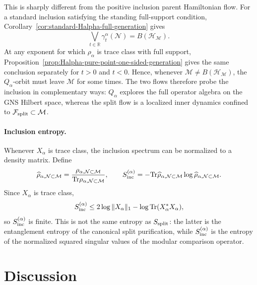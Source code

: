 \documentclass[a4paper,11pt]{article}
\theoremstyle{definition}
\newcommand{\Tr}{\text{Tr}}
\newcommand{\mN}{\mathcal{N}}
\newcommand{\mH}{\mathcal{H}}
\newcommand{\mM}{\mathcal{M}}
\begin{document}
This is sharply different from the positive inclusion parent Hamiltonian flow. For
a standard inclusion satisfying the standing full-support condition, Corollary~\ref{cor:standard-Halpha-full-generation}
gives
\begin{equation}
    \bigvee_{t\in\mathbb R}
    \gamma_t^\alpha(\mN)
    =B(\mH_{\mM}).
    \label{eq:Hinc-does-not-preserve-N}
\end{equation}
At any exponent for which $\rho_\alpha$ is trace class with full support,
Proposition~\ref{prop:Halpha-pure-point-one-sided-generation} gives the same
conclusion separately for $t>0$ and $t<0$.
Hence, whenever $\mM\neq B(\mH_{\mM})$, the $Q_\alpha$-orbit must
leave $\mM$ for some times. The two flows therefore probe the inclusion
in complementary ways: $Q_\alpha$ explores the full operator algebra on the
GNS Hilbert space, whereas the split flow is a localized inner dynamics
confined to $\mathcal F_{\rm split}\subset\mM$.

\paragraph{Inclusion entropy.}
Whenever $X_\alpha$ is trace class, the inclusion spectrum can be normalized to a density matrix. Define
\begin{equation}
    \widehat\rho_{\alpha,\mN\subset\mM}
    =\frac{\rho_{\alpha,\mN\subset\mM}}
           {\Tr\rho_{\alpha,\mN\subset\mM}},
    \qquad
    S_{\rm inc}^{(\alpha)}
    =-\Tr\widehat\rho_{\alpha,\mN\subset\mM}
          \log\widehat\rho_{\alpha,\mN\subset\mM}.
    \label{eq:rho-inclusion-normalized}
\end{equation}
Since $X_\alpha$ is trace class,
\begin{equation}
    S_{\rm inc}^{(\alpha)}
    \le
    2\log\|X_\alpha\|_1
    -\log\Tr(X_\alpha^*X_\alpha),
    \label{eq:Sinclusion-nuclearity-bound}
\end{equation}
so $S_{\rm inc}^{(\alpha)}$ is finite. This is not the same entropy as
$S_{\rm split}$: the latter is the entanglement entropy of the canonical split
purification, while $S_{\rm inc}^{(\alpha)}$ is the entropy of the normalized
squared singular values of the modular comparison operator.

\section{Discussion}\label{sec:discussion}
\end{document}
